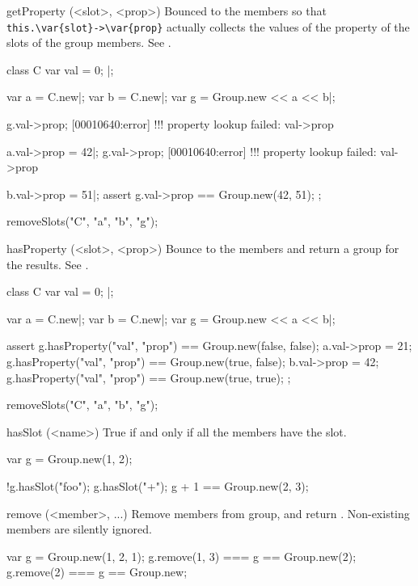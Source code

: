 \begin{urbiscriptapi}
\item[getProperty](<slot>, <prop>)%
  Bounced to the members so that \lstinline|this.\var{slot}->\var{prop}|
  actually collects the values of the property  of the slots
   of the group members.  See .
\begin{urbiscript}
class C
{
  var val = 0;
}|;

var a = C.new|; var b = C.new|;
var g = Group.new << a << b|;

g.val->prop;
[00010640:error] !!! property lookup failed: val->prop

a.val->prop = 42|;
g.val->prop;
[00010640:error] !!! property lookup failed: val->prop

b.val->prop = 51|;
assert
{
  g.val->prop == Group.new(42, 51);
};
\end{urbiscript}
\begin{urbicomment}
  removeSlots("C", "a", "b", "g");
\end{urbicomment}


\item[hasProperty](<slot>, <prop>)%
  Bounce to the members and return a group for the results.  See
  .
\begin{urbiscript}
class C
{
  var val = 0;
}|;

var a = C.new|; var b = C.new|;
var g = Group.new << a << b|;

assert
{
  g.hasProperty("val", "prop") == Group.new(false, false);
  a.val->prop = 21;
  g.hasProperty("val", "prop") == Group.new(true, false);
  b.val->prop = 42;
  g.hasProperty("val", "prop") == Group.new(true, true);
};
\end{urbiscript}
\begin{urbicomment}
  removeSlots("C", "a", "b", "g");
\end{urbicomment}


\item[hasSlot](<name>)%
  True if and only if all the members have the slot.

\begin{urbiassert}
var g = Group.new(1, 2);

!g.hasSlot("foo");
 g.hasSlot("+");
 g + 1 == Group.new(2, 3);
\end{urbiassert}


\item[remove](<member>, ...)%
  Remove members from \this group, and return \this.  Non-existing members
  are silently ignored.
\begin{urbiassert}
var g = Group.new(1, 2, 1);
g.remove(1, 3) === g == Group.new(2);
g.remove(2)    === g == Group.new;
\end{urbiassert}



\end{urbiscriptapi}
